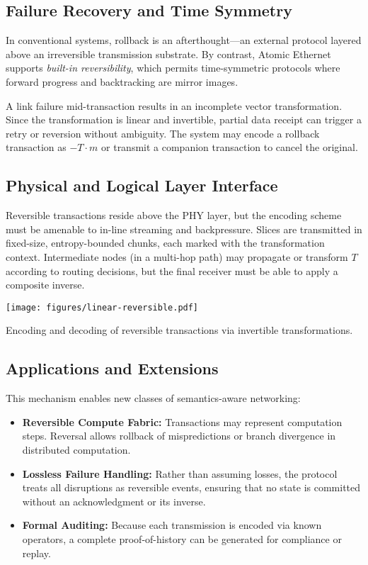 \subsection{Failure Recovery and Time Symmetry}

In conventional systems, rollback is an afterthought—an external protocol layered above an irreversible transmission substrate. By contrast, Atomic Ethernet supports \emph{built-in reversibility}, which permits time-symmetric protocols where forward progress and backtracking are mirror images.

A link failure mid-transaction results in an incomplete vector transformation. Since the transformation is linear and invertible, partial data receipt can trigger a retry or reversion without ambiguity. The system may encode a rollback transaction as $-T \cdot m$ or transmit a companion transaction to cancel the original.

\subsection{Physical and Logical Layer Interface}

Reversible transactions reside above the PHY layer, but the encoding scheme must be amenable to in-line streaming and backpressure. Slices are transmitted in fixed-size, entropy-bounded chunks, each marked with the transformation context. Intermediate nodes (in a multi-hop path) may propagate or transform $T$ according to routing decisions, but the final receiver must be able to apply a composite inverse.

\begin{marginfigure}
  \texttt{[image: figures/linear-reversible.pdf]}
  \caption{Encoding and decoding of reversible transactions via invertible transformations.}
\end{marginfigure}

\subsection{Applications and Extensions}

This mechanism enables new classes of semantics-aware networking:

\begin{itemize}
  \item \textbf{Reversible Compute Fabric:} Transactions may represent computation steps. Reversal allows rollback of mispredictions or branch divergence in distributed computation.
  \item \textbf{Lossless Failure Handling:} Rather than assuming losses, the protocol treats all disruptions as reversible events, ensuring that no state is committed without an acknowledgment or its inverse.
  \item \textbf{Formal Auditing:} Because each transmission is encoded via known operators, a complete proof-of-history can be generated for compliance or replay.
\end{itemize}

